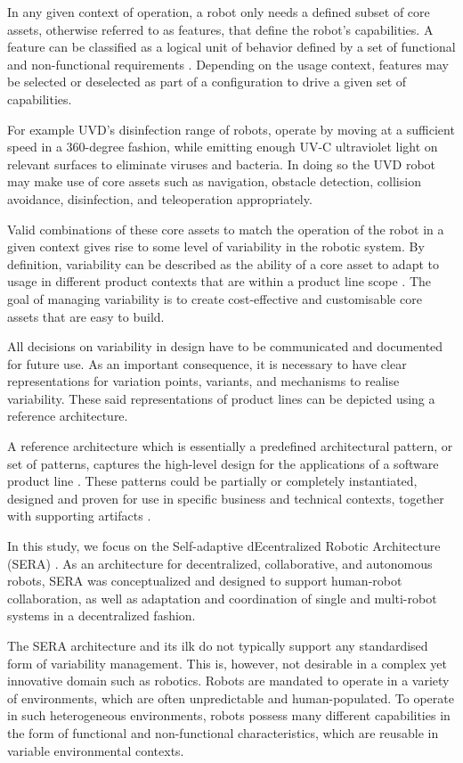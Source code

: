 \documentclass[conference]{IEEEtran}
\begin{document}
In any given context of operation, a robot only needs a defined subset of core assets, otherwise referred to as features, that define the robot's capabilities. A feature can be classified as a logical unit of behavior defined by a set of functional and non-functional requirements \cite{feats}. Depending on the usage context, features may be selected or deselected as part of a configuration to drive a given set of capabilities. 

For example UVD's disinfection range of robots, operate by moving at a sufficient speed in a 360-degree fashion, while emitting enough UV-C ultraviolet light on relevant surfaces to eliminate viruses and bacteria. In doing so the UVD robot may make use of core assets such as navigation, obstacle detection, collision avoidance, disinfection, and teleoperation appropriately.

Valid combinations of these core assets to match the operation of the robot in a given context gives rise to some level of variability in the robotic system. By definition, variability can be described as the ability of a core asset to adapt to usage in different product contexts that are within a product line scope \cite{variab}. The goal of managing variability is to create cost-effective and customisable core assets that are easy to build.

All decisions on variability in design have to be communicated and documented for future use. As an important consequence, it is necessary to have clear representations for variation points, variants, and mechanisms to realise variability. These said representations of product lines can be depicted using a reference architecture.

A reference architecture which is essentially a predefined architectural pattern, or set of patterns, captures the high-level design for the applications of a software product line \cite{sple}. These patterns could be partially or completely instantiated, designed and proven for use in specific business and technical contexts, together with supporting artifacts \cite{ref-arch}.

In this study, we focus on the Self-adaptive dEcentralized Robotic Architecture (SERA) \cite{sera}. As an architecture for decentralized, collaborative, and autonomous robots, SERA was conceptualized and designed to support human-robot collaboration, as well as adaptation and coordination of single and multi-robot systems in a decentralized fashion.

The SERA architecture and its ilk do not typically support any standardised form of variability management. This is, however, not desirable in a complex yet innovative domain such as robotics. Robots are mandated to operate in a variety of environments, which are often unpredictable and human-populated. To operate in such heterogeneous environments, robots possess many different capabilities in the form of functional and non-functional characteristics, which are reusable in variable environmental contexts.
\end{document}
